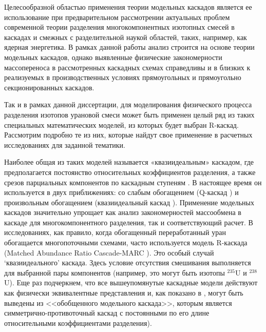Целесообразной областью применения теории модельных каскадов является ее использование при предварительном рассмотрении актуальных проблем современной теории разделения многокомпонентных изотопных смесей в каскадах и смежных с разделительной наукой областей, таких, например, как ядерная энергетика. В рамках данной работы анализ строится на основе теории модельных каскадов, однако выявленные физические закономерности массопереноса в рассмотренных каскадных схемах справедливы и в близких к реализуемых в производственных условиях прямоугольных и прямоугольно секционированных каскадов.

Так и в рамках данной диссертации, для моделирования физического процесса разделения изотопов урановой смеси может быть применен целый ряд из таких специальных математических моделей, из которых будет выбран R-каскад. Рассмотрим подробно те из них, которые найдут свое применение в расчетных исследованиях для заданной тематики.

Наиболее общая из таких моделей называется «квазиидеальным» каскадом, где предполагается постоянство относительных коэффициентов разделения, а также срезов парциальных компонентов по каскадным ступеням \cite{yamamotoMulticomponentIsotopeSeparating1978}.
В настоящее время он используется в двух приближениях: со слабым обогащением (Q-каскад \cite{borisevichNewApproachOptimize2011, kolokoltsovDesignCascadesSeparating1970, zengQCascadeExplanation2012}) и произвольным обогащением (квазиидеальный каскад \cite{sulaberidzeSpecialFeaturesEnrichment2006}).
Применение модельных каскадов значительно упрощает как анализ закономерностей массообмена в каскаде для многокомпонентного разделения, так и соответствующий расчет.
В исследованиях, как правило, когда обогащенный переработанный уран обогащается многопоточными схемами, часто используется модель R-каскада (Matched Abundance Ratio Cascade-MARC \cite{kazukihidaSimultaneousEvaluationEffects1986, delagarzaMulticomponentIsotopeSeparation1961, woodEffectsSeparationProcesses2008}).
Это особый случай `квазиидеального' каскада. Здесь условие отсутствия смешивания выполняется для выбранной пары компонентов (например, это могут быть изотопы $^{235}$U и $^{238}$U).
Еще раз подчеркнем, что все вышеупомянутые каскадные модели действуют как физически эквивалентные представления и, как показано в \cite{sulaberidzeClassificationModelCascades2020}, могут быть выведены из <<обобщенного модельного каскада>>, которым является симметрично-противоточный каскад с постоянными по его длине относительными коэффициентами разделения).

